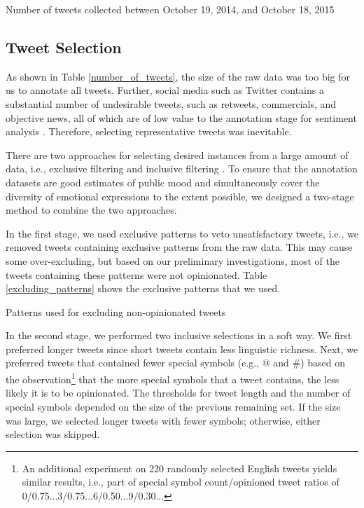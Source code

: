 \documentclass[english]{jnlp_1.4}
\begin{document}
\begin{table}[t]
\caption{Number of tweets collected between October 19, 2014, and October 18, 2015}
\label{number_of_tweets}

\end{table}


\subsection{Tweet Selection}

As shown in Table \ref{number_of_tweets}, the size of the raw data was too big for us to annotate all tweets. Further, social media such as Twitter contains a substantial number of undesirable tweets, such as retweets, commercials, and objective news, all of which are of low value to the annotation stage for sentiment analysis \cite{Jansen09}. Therefore, selecting representative tweets was inevitable.

There are two approaches for selecting desired instances from a large amount of data, i.e., exclusive filtering \cite{Hangyo14} and inclusive filtering \cite{Nakov13}. To ensure that the annotation datasets are good estimates of public mood and simultaneously cover the diversity of emotional expressions to the extent possible, we designed a two-stage method to combine the two approaches.

In the first stage, we used exclusive patterns to veto unsatisfactory tweets, i.e., we removed tweets containing exclusive patterns from the raw data. This may cause some over-excluding, but based on our preliminary investigations, most of the tweets containing these patterns were not opinionated. Table \ref{excluding_patterns} shows the exclusive patterns that we used.

\begin{table}[b]
\caption{Patterns used for excluding non-opinionated tweets}
\label{excluding_patterns}

\end{table}

In the second stage, we performed two inclusive selections in a soft way. We first preferred longer tweets since short tweets contain less linguistic richness. Next, we preferred tweets that contained fewer special symbols (e.g., @ and \#) based on the observation\footnote{An additional experiment on 220 randomly selected English tweets yields similar results, i.e., part of special symbol count/opinioned tweet ratios of 0/0.75...3/0.75...6/0.50...9/0.30...} that the more special symbols that a tweet contains, the less likely it is to be opinionated. The thresholds for tweet length and the number of special symbols depended on the size of the previous remaining set. If the size was large, we selected longer tweets with fewer symbols; otherwise, either selection was skipped.
\end{document}
